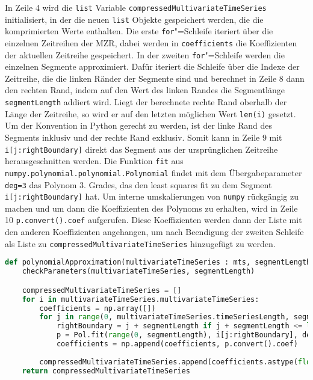 In Zeile 4 wird die \lstinline|list| Variable \lstinline|compressedMultivariateTimeSeries| initialisiert, in der die neuen \lstinline|list| Objekte gespeichert werden, die die komprimierten Werte enthalten. Die erste \lstinline|for|"=Schleife iteriert über die einzelnen Zeitreihen der \ac{MZR}, dabei werden in \texttt{coeffi\allowbreak cients} die Koeffizienten der aktuellen Zeitreihe gespeichert. In der zweiten \lstinline|for|"=Schleife werden die einzelnen Segmente approximiert. Dafür iteriert die Schleife über die Indexe der Zeitreihe, die die linken Ränder der Segmente sind und berechnet in Zeile 8 dann den rechten Rand, indem auf den Wert des linken Randes die Segmentlänge \lstinline|segmentLength| addiert wird. Liegt der berechnete rechte Rand oberhalb der Länge der Zeitreihe, so wird er auf den letzten möglichen Wert \lstinline|len(i)| gesetzt. Um der Konvention in Python gerecht zu werden, ist der linke Rand des Segments inklusiv und der rechte Rand exklusiv. Somit kann in Zeile 9 mit \lstinline|i[j:rightBoundary]| direkt das Segment aus der ursprünglichen Zeitreihe herausgeschnitten werden. Die Funktion \lstinline|fit| aus \lstinline|numpy.polynomial.polynomial.Polynomial| findet mit dem Übergabeparameter \lstinline|deg=3| das Polynom 3. Grades, das den least squares fit zu dem Segment \lstinline|i[j:rightBoundary]| hat. Um interne umskalierungen von \lstinline|numpy| rückgängig zu machen und um dann die Koeffizienten des Polynoms zu erhalten, wird in Zeile 10 \lstinline|p.convert().coef| aufgerufen. Diese Koeffizienten werden dann der Liste mit den anderen Koeffizienten angehangen, um nach Beendigung der zweiten Schleife als Liste zu \lstinline|compressedMultivariateTimeSeries| hinzugefügt zu werden.
\begin{lstlisting}[caption=Stückweise polynomielle Approximation, label=lst:stückweisepolynomielleapproximation, style=Python, language=Python]
def polynomialApproximation(multivariateTimeSeries : mts, segmentLength : int):
    checkParameters(multivariateTimeSeries, segmentLength)

    compressedMultivariateTimeSeries = []
    for i in multivariateTimeSeries.multivariateTimeSeries:
        coefficients = np.array([])
        for j in range(0, multivariateTimeSeries.timeSeriesLength, segmentLength):
            rightBoundary = j + segmentLength if j + segmentLength <= len(i) else len(i)
            p = Pol.fit(range(0, segmentLength), i[j:rightBoundary], deg=3)
            coefficients = np.append(coefficients, p.convert().coef)
        
        compressedMultivariateTimeSeries.append(coefficients.astype(float).tolist())
    return compressedMultivariateTimeSeries
\end{lstlisting}

